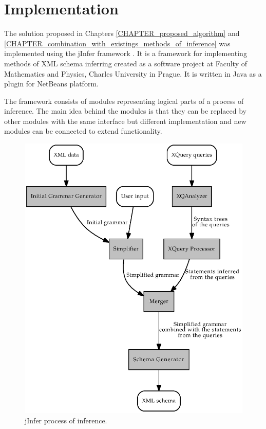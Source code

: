 \chapter{Implementation}
The solution proposed in Chapters \ref{CHAPTER_proposed_algorithm} and \ref{CHAPTER_combination_with_existings_methods_of_inference} was implemented using the jInfer framework \cite{jinfer}. It is a framework for implementing methods of XML schema inferring created as a software project at Faculty of Mathematics and Physics, Charles University in Prague. It is written in Java as a plugin for NetBeans platform.

The framework consists of modules representing logical parts of a process of inference. The main idea behind the modules is that they can be replaced by other modules with the same interface but different implementation and new modules can be connected to extend functionality.

\begin{figure}
\label{FIG_jinfer}
\caption{jInfer process of inference.}
\includegraphics[scale=1]{jinfer.eps}
\end{figure}

